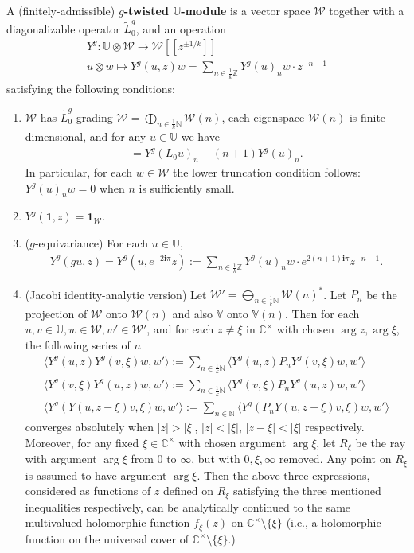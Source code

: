 \documentclass[12pt,a4paper,notitlepage]{article}
\theoremstyle{definition}
\theoremstyle{plain}
\newcommand{\mc}{\mathcal}
\newcommand{\wtd}{\widetilde}
\newcommand{\id}{\mathbf{1}}
\newcommand{\bk}[1]{\langle {#1}\rangle}
\newcommand{\im}{\mathbf{i}}
\newcommand{\Vbb}{\mathbb V}
\newcommand{\Ubb}{\mathbb U}
\newcommand{\Cbb}{\mathbb C}
\newcommand{\Nbb}{\mathbb N}
\newcommand{\Zbb}{\mathbb Z}
\numberwithin{equation}{section}
\begin{document}
A (finitely-admissible)  \textbf{$g$-twisted $\Ubb$-module} is a vector space $\mc W$ together with a diagonalizable operator $\wtd L_0^g$, and an operation
\begin{gather*}
Y^g:\Ubb\otimes\mc W\rightarrow	\mc W[[z^{\pm 1/k}]]\\
u\otimes w\mapsto Y^g(u,z)w=\sum_{n\in \frac 1k \Zbb}Y^g(u)_nw\cdot z^{-n-1}
\end{gather*}
satisfying the following conditions:
\begin{enumerate}
\item $\mc W$ has $\wtd L_0^g$-grading $\mc W=\bigoplus_{n\in\frac 1k\Nbb}\mc W(n)$, each eigenspace $\mc W(n)$ is finite-dimensional, and for any $u\in\Ubb$ we have
\begin{align}
[\wtd L_0^g,Y^g(u)_n]=Y^g(L_0u)_n-(n+1)Y^g(u)_n.\label{eq43}	
\end{align}
In particular, for each $w\in\mc W$ the lower truncation condition follows: $Y^g(u)_nw=0$ when $n$ is sufficiently small.
\item $Y^g(\id,z)=\id_{\mc W}$.
\item ($g$-equivariance) For each $u\in\Ubb$,
\begin{align}
Y^g(gu,z)=Y^g(u,e^{-2\im\pi}z):=\sum_{n\in \frac 1k \Zbb}Y^g(u)_nw\cdot e^{2(n+1)\im\pi}z^{-n-1}.\label{eq45}
\end{align}
\item (Jacobi identity-analytic version) Let $\mc W'=\bigoplus_{n\in\frac 1k\Nbb}\mc W(n)^*$. Let $P_n$ be the projection of $\mc W$ onto $\mc W(n)$ and also $\Vbb$ onto $\Vbb(n)$. Then for each $u,v\in\Ubb,w\in\mc W,w'\in\mc W'$, and for each $z\neq \xi$ in $\Cbb^\times$ with chosen $\arg z,\arg \xi$, the following series of $n$
\begin{gather}
\bk{Y^g(u,z)Y^g(v,\xi)w,w'}:=\sum_{n\in\frac 1k\Nbb}	\bk{Y^g(u,z)P_nY^g(v,\xi)w,w'}\label{eq50}\\
\bk{Y^g(v,\xi)Y^g(u,z)w,w'}:=\sum_{n\in\frac 1k\Nbb}	\bk{Y^g(v,\xi)P_nY^g(u,z)w,w'}\label{eq51}\\
\bk{Y^g(Y(u,z-\xi)v,\xi)w,w'}:=\sum_{n\in\Nbb}	\bk{Y^g(P_nY(u,z-\xi)v,\xi)w,w'}\label{eq52}
\end{gather}
converges absolutely when $|z|>|\xi|$, $|z|<|\xi|$, $|z-\xi|<|\xi|$ respectively. Moreover, for any fixed $\xi\in\Cbb^\times$ with chosen argument $\arg \xi$, let $R_{\xi}$ be the ray with argument $\arg \xi$ from $0$ to $\infty$, but with $0,\xi,\infty$ removed. Any point on $R_{\xi}$ is assumed to have argument $\arg \xi$. Then the above three expressions, considered as functions of $z$ defined on $R_{\xi}$ satisfying the three mentioned inequalities respectively, can be analytically continued to the same multivalued holomorphic function $f_{\xi}(z)$ on $\Cbb^\times\setminus\{\xi\}$ (i.e., a holomorphic function on the universal cover of $\Cbb^\times\setminus\{\xi\}$.)
\end{enumerate}
\end{document}
